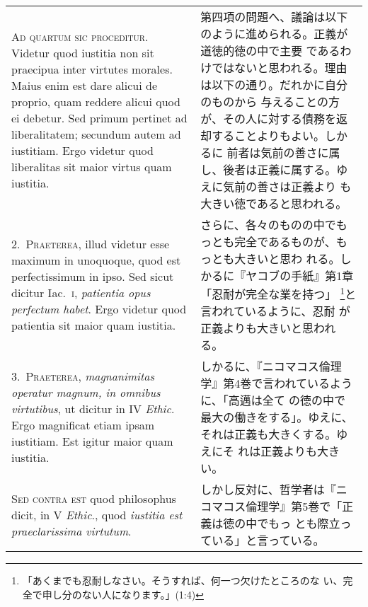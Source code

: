 \documentclass[10pt]{jsarticle}
\begin{document}
\begin{longtable}{p{21em}p{21em}}
{\scshape Ad quartum sic proceditur}. Videtur quod iustitia non sit
praecipua inter virtutes morales. Maius enim est dare alicui de
proprio, quam reddere alicui quod ei debetur. Sed primum pertinet ad
liberalitatem; secundum autem ad iustitiam. Ergo videtur quod
liberalitas sit maior virtus quam iustitia.


&

第四項の問題へ、議論は以下のように進められる。正義が道徳的徳の中で主要
であるわけではないと思われる。理由は以下の通り。だれかに自分のものから
与えることの方が、その人に対する債務を返却することよりもよい。しかるに
前者は気前の善さに属し、後者は正義に属する。ゆえに気前の善さは正義より
も大きい徳であると思われる。

\\



2.~{\scshape Praeterea}, illud videtur esse maximum in unoquoque, quod
est perfectissimum in ipso. Sed sicut dicitur Iac.~{\scshape i},
{\itshape patientia opus perfectum habet}. Ergo videtur quod patientia
sit maior quam iustitia.

&

さらに、各々のものの中でもっとも完全であるものが、もっとも大きいと思わ
れる。しかるに『ヤコブの手紙』第1章「忍耐が完全な業を持つ」
\footnote{「あくまでも忍耐しなさい。そうすれば、何一つ欠けたところのな
い、完全で申し分のない人になります。」(1:4)}と言われているように、忍耐
が正義よりも大きいと思われる。

\\



3.~{\scshape Praeterea}, {\itshape magnanimitas operatur magnum, in
omnibus virtutibus}, ut dicitur in IV {\itshape Ethic}. Ergo
magnificat etiam ipsam iustitiam. Est igitur maior quam iustitia.

&

しかるに、『ニコマコス倫理学』第4巻で言われているように、「高邁は全て
の徳の中で最大の働きをする」。ゆえに、それは正義も大きくする。ゆえにそ
れは正義よりも大きい。

\\


{\scshape Sed contra est} quod philosophus dicit, in V {\itshape
Ethic}., quod {\itshape iustitia est praeclarissima virtutum}.


&

しかし反対に、哲学者は『ニコマコス倫理学』第5巻で「正義は徳の中でもっ
とも際立っている」と言っている。


\end{longtable}
\end{document}

